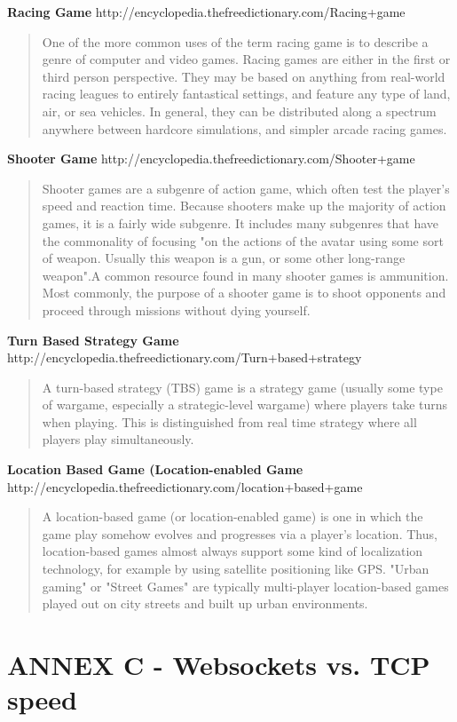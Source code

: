 \documentclass{article}
\begin{document}
\textbf{Racing Game}
	http://encyclopedia.thefreedictionary.com/Racing+game
\begin{quote}
One of the more common uses of the term racing game is to describe a genre of
computer and video games. Racing games are either in the first or third person
perspective. They may be based on anything from real-world racing leagues to
entirely fantastical settings, and feature any type of land, air, or sea
vehicles. In general, they can be distributed along a spectrum anywhere between
hardcore simulations, and simpler arcade racing games.
\end{quote}
\textbf{Shooter Game}
	http://encyclopedia.thefreedictionary.com/Shooter+game
\begin{quote}
Shooter games are a subgenre of action game, which often test the player's speed
and reaction time. Because shooters make up the majority of action games, it is
a fairly wide subgenre. It includes many subgenres that have the commonality of
focusing "on the actions of the avatar using some sort of weapon. Usually this
weapon is a gun, or some other long-range weapon".A common resource found in
many shooter games is ammunition. Most commonly, the purpose of a shooter
game is to shoot opponents and proceed through missions without dying yourself.
\end{quote}
	
\textbf{Turn Based Strategy Game}
	http://encyclopedia.thefreedictionary.com/Turn+based+strategy
\begin{quote}
A turn-based strategy (TBS) game is a strategy game (usually some type of
wargame, especially a strategic-level wargame) where players take turns when
playing. This is distinguished from real time strategy where all players play
simultaneously.
\end{quote}

\textbf{Location Based Game (Location-enabled Game}
	http://encyclopedia.thefreedictionary.com/location+based+game
\begin{quote}
A location-based game (or location-enabled game) is one in which the game play
somehow evolves and progresses via a player's location. Thus, location-based
games almost always support some kind of localization technology, for example by
using satellite positioning like GPS. "Urban gaming" or "Street Games" are
typically multi-player location-based games played out on city streets and built
up urban environments.
\end{quote}


\section{ANNEX C - Websockets vs. TCP speed}
\end{document}
